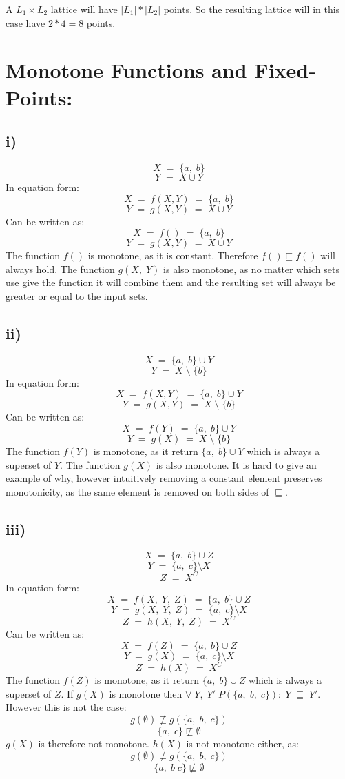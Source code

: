 \documentclass{article}
\begin{document}
\noindent A $L_1 \times L_2$ lattice will have $|L_1| * |L_2|$ points. So the resulting lattice will in this case have $2 * 4 = 8$ points.
\section*{Monotone Functions and Fixed-Points:}

\subsection*{i)}
$$X\;=\;\{a,\;b\}$$
$$Y\;=\;X\cup Y$$
In equation form:
$$X\;=\;f(X, Y)\;=\;\{a,\;b\}$$
$$Y\;=\;g(X, Y)\;=\;X\cup Y$$
Can be written as:
$$X\;=\;f()\;=\;\{a,\;b\}$$
$$Y\;=\;g(X, Y)\;=\;X\cup Y$$
The function $f()$ is monotone, as it is constant. Therefore $f() \sqsubseteq f()$ will always hold. The function $g(X,\;Y)$ is also monotone, as no matter which sets use give the function it will combine them and the resulting set will always be greater or equal to the input sets.

\subsection*{ii)}
$$X\;=\;\{a,\;b\}\cup Y$$
$$Y\;=\;X\;\setminus\;\{b\}$$
In equation form:
$$X\;=\;f(X, Y)\;=\;\{a,\;b\}\cup Y$$
$$Y\;=\;g(X, Y)\;=\;X\;\setminus\;\{b\}$$
Can be written as:
$$X\;=\;f(Y)\;=\;\{a,\;b\}\cup Y$$
$$Y\;=\;g(X)\;=\;X\;\setminus\;\{b\}$$
The function $f(Y)$ is monotone, as it return $\{a,\;b\}\cup Y$ which is always a superset of $Y$. The function $g(X)$ is also monotone. It is hard to give an example of why, however intuitively removing a constant element preserves monotonicity, as the same element is removed on both sides of $\sqsubseteq$.
\subsection*{iii)}
$$X\;=\;\{a,\;b\}\cup Z$$
$$Y\;=\;\{a,\;c\}\setminus X$$
$$Z\;=\;X^C$$
In equation form:
$$X\;=\;f(X,\;Y,\;Z)\;=\;\{a,\;b\}\cup Z$$
$$Y\;=\;g(X,\;Y,\;Z)\;=\;\{a,\;c\}\setminus X$$
$$Z\;=\;h(X,\;Y,\;Z)\;=\;X^C$$
Can be written as:
$$X\;=\;f(Z)\;=\;\{a,\;b\}\cup Z$$
$$Y\;=\;g(X)\;=\;\{a,\;c\}\setminus X$$
$$Z\;=\;h(X)\;=\;X^C$$
The function $f(Z)$ is monotone, as it return $\{a,\;b\}\cup Z$ which is always a superset of $Z$. If $g(X)$ is monotone then $\forall\;Y,\;Y'\;P(\{a,\;b,\;c\}):\;Y\;\sqsubseteq\;Y'$. However this is not the case:
$$g(\emptyset)\not\sqsubseteq g(\{a,\;b,\;c\})$$
$$\{a,\;c\}\not\sqsubseteq \emptyset$$
$g(X)$ is therefore not monotone. $h(X)$ is not monotone either, as:
$$g(\emptyset)\not\sqsubseteq g(\{a,\;b,\;c\})$$
$$\{a,\;b\;c\}\not\sqsubseteq \emptyset$$
\end{document}
